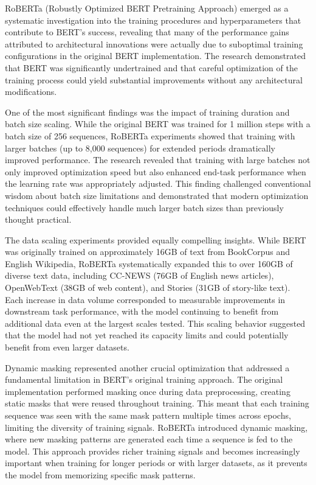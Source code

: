 \documentclass[
  titlepage]{article}
\begin{document}
RoBERTa (Robustly Optimized BERT Pretraining Approach) emerged as a
systematic investigation into the training procedures and
hyperparameters that contribute to BERT's success, revealing that many
of the performance gains attributed to architectural innovations were
actually due to suboptimal training configurations in the original BERT
implementation. The research demonstrated that BERT was significantly
undertrained and that careful optimization of the training process could
yield substantial improvements without any architectural modifications.

One of the most significant findings was the impact of training duration
and batch size scaling. While the original BERT was trained for 1
million steps with a batch size of 256 sequences, RoBERTa experiments
showed that training with larger batches (up to 8,000 sequences) for
extended periods dramatically improved performance. The research
revealed that training with large batches not only improved optimization
speed but also enhanced end-task performance when the learning rate was
appropriately adjusted. This finding challenged conventional wisdom
about batch size limitations and demonstrated that modern optimization
techniques could effectively handle much larger batch sizes than
previously thought practical.

The data scaling experiments provided equally compelling insights. While
BERT was originally trained on approximately 16GB of text from
BookCorpus and English Wikipedia, RoBERTa systematically expanded this
to over 160GB of diverse text data, including CC-NEWS (76GB of English
news articles), OpenWebText (38GB of web content), and Stories (31GB of
story-like text). Each increase in data volume corresponded to
measurable improvements in downstream task performance, with the model
continuing to benefit from additional data even at the largest scales
tested. This scaling behavior suggested that the model had not yet
reached its capacity limits and could potentially benefit from even
larger datasets.

Dynamic masking represented another crucial optimization that addressed
a fundamental limitation in BERT's original training approach. The
original implementation performed masking once during data
preprocessing, creating static masks that were reused throughout
training. This meant that each training sequence was seen with the same
mask pattern multiple times across epochs, limiting the diversity of
training signals. RoBERTa introduced dynamic masking, where new masking
patterns are generated each time a sequence is fed to the model. This
approach provides richer training signals and becomes increasingly
important when training for longer periods or with larger datasets, as
it prevents the model from memorizing specific mask patterns.
\end{document}
